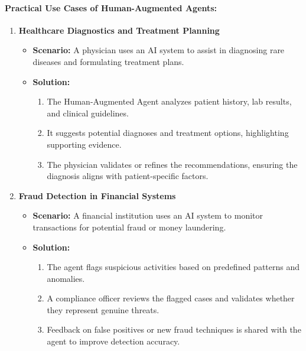 \documentclass[12pt]{article}
\begin{document}
\paragraph{Practical Use Cases of Human-Augmented Agents:}
\begin{enumerate}
    \item \textbf{Healthcare Diagnostics and Treatment Planning}
    \begin{itemize}
        \item \textbf{Scenario:} A physician uses an AI system to assist in diagnosing rare diseases and formulating treatment plans.
        \item \textbf{Solution:}
        \begin{enumerate}
            \item The Human-Augmented Agent analyzes patient history, lab results, and clinical guidelines.
            \item It suggests potential diagnoses and treatment options, highlighting supporting evidence.
            \item The physician validates or refines the recommendations, ensuring the diagnosis aligns with patient-specific factors.
        \end{enumerate}
    \end{itemize}
    \item \textbf{Fraud Detection in Financial Systems}
    \begin{itemize}
        \item \textbf{Scenario:} A financial institution uses an AI system to monitor transactions for potential fraud or money laundering.
        \item \textbf{Solution:}
        \begin{enumerate}
            \item The agent flags suspicious activities based on predefined patterns and anomalies.
            \item A compliance officer reviews the flagged cases and validates whether they represent genuine threats.
            \item Feedback on false positives or new fraud techniques is shared with the agent to improve detection accuracy.
        \end{enumerate}
    \end{itemize}
    

\end{enumerate}
\end{document}
